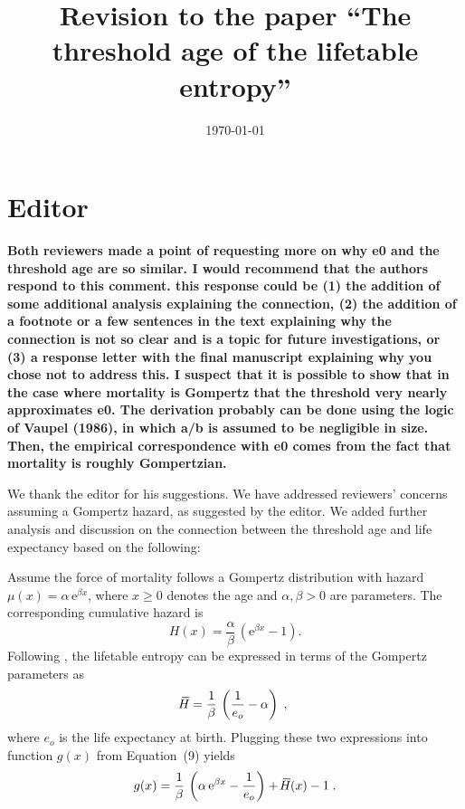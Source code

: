 \documentclass[a4paper,twoside, openright, 12pt, leqno]{article}
\title{Revision to the paper ``The threshold age of the lifetable entropy''}
\date{\today}
\newcommand*\xbar[1]{%
   \hbox{%
     \vbox{%
       \hrule height 0.5pt %
       \kern0.3ex%
       \hbox{%
         \kern-0.28em%
         \ensuremath{#1}%
         \kern-0.05em%
       }%
     }%
   }%
}
\begin{document}
\maketitle

\section*{Editor}
\textbf{Both reviewers made a point of requesting more on why e0 and the threshold age are so similar. I would recommend that the authors respond to this comment. this response could be  (1) the addition of  some additional analysis explaining the connection, (2) the addition of  a footnote or a few sentences in the text explaining why the connection is not so clear and is a topic for future investigations, or (3) a response letter with the final manuscript explaining why you chose not to address this. I suspect that it is possible to show that in the case where mortality is Gompertz that the threshold very nearly approximates e0. The derivation probably can be done using the logic of Vaupel (1986), in which a/b is assumed to be negligible in size. Then, the empirical correspondence with e0 comes from the fact that mortality is roughly Gompertzian.}
\linebreak

We thank the editor for his suggestions. We have addressed reviewers' concerns assuming a Gompertz hazard, as suggested by the editor. We added further analysis and discussion on the connection between the threshold age and life expectancy based on the following:
\linebreak

Assume the force of mortality follows a Gompertz distribution with hazard $\mu(x) = \alpha\,\mathrm{e}^{\beta x}$, where $x\geq0$ denotes the age and $\alpha,\beta>0$ are parameters. The corresponding cumulative hazard is 
$$
H(x)=\frac{\alpha}{\beta}\,\left(\mathrm{e}^{\beta x} - 1 \right).
$$
Following \cite{wrycza2014entropy}, the lifetable entropy can be expressed in terms of the Gompertz parameters as
$$
\xbar{H}=\frac{1}{\beta}\,\left(\frac{1}{e_o}-\alpha\right)\;,
$$
where $e_o$ is the life expectancy at birth. Plugging these two expressions into function $g(x)$ from Equation~(9) yields
\begin{equation}
g(x) = \frac{1}{\beta}\,\left(\alpha\,\mathrm{e}^{\beta x} - \frac{1}{e_o} \right)+\,\xbar{H}(x)-1\;.
\label{eq.gx}
\end{equation}
\end{document}
